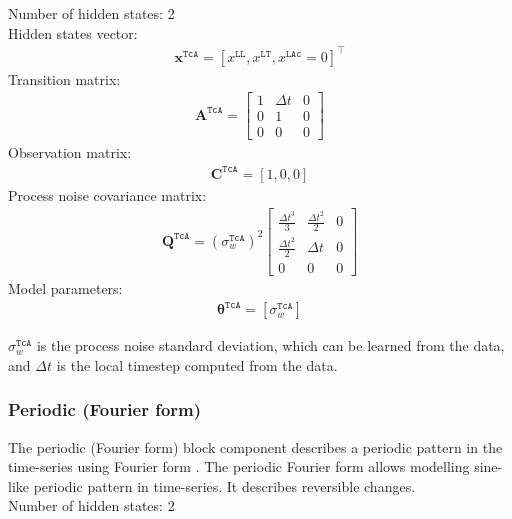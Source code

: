 \noindent
Number of hidden states: 2\\
Hidden states vector: 
\begin{gather*}
 \mathbf{x}^{\mathtt{TcA}} = [x^{\mathtt{LL}}, x^{\mathtt{LT}} , x^{\mathtt{LAc}}=0]^{\intercal}
 \end{gather*}
Transition matrix: 
\begin{gather*}
\mathbf{A}^{\mathtt{TcA}}= \left[\begin{array}{ccc}1&\Delta t&0\\0&1&0\\0&0&0\end{array}\right]
\end{gather*}
Observation matrix: 
\begin{gather*}
\mathbf{C}^{\mathtt{TcA}}=[1, 0, 0]
\end{gather*}
Process noise covariance matrix: 
\begin{gather*}
\mathbf{Q}^{\mathtt{TcA}}=(\sigma_{w}^{\mathtt{TcA}})^{2}  \left[\begin{array}{ccc}\tfrac{\Delta t^{3}}{3} &\tfrac{\Delta t^{2}}{2}&0\\\tfrac{\Delta t^{2}}{2}&\Delta t&0\\0&0&0\end{array}\right] 
\end{gather*}
Model parameters: 
\begin{gather*}
\bm\theta^{\mathtt{TcA}}=[\sigma_{w}^{\mathtt{TcA}} ]
\end{gather*}

\noindent
$\sigma_{w}^{\mathtt{TcA}}$ is the process noise standard deviation, which can be learned from the data, and $\Delta t$ is the local timestep computed from the data.



\subsubsection{Periodic (Fourier form)}

The periodic (Fourier form) block component describes a periodic pattern in the time-series using Fourier form \cite{west1999bayesian,STC:STC2035}. 
The periodic Fourier form allows modelling sine-like periodic pattern in time-series.
It describes reversible changes.\\

\noindent
Number of hidden states: 2\\

